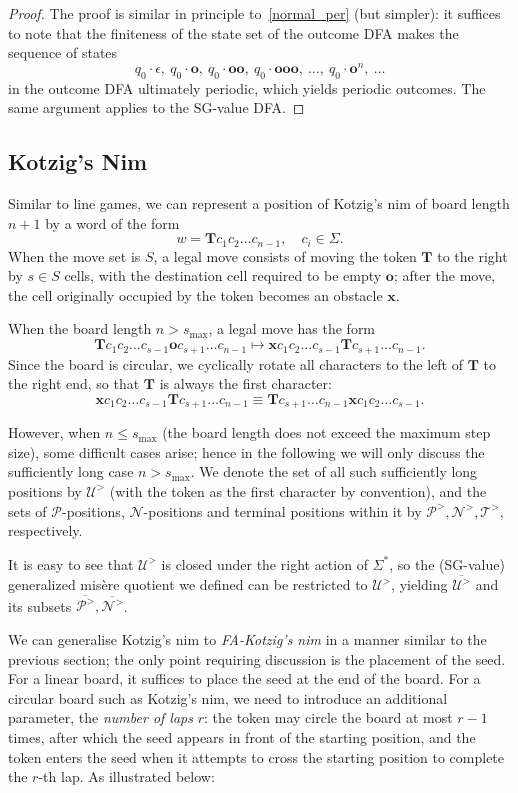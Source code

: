 \documentclass[11pt]{article}
\theoremstyle{definition}
\theoremstyle{plain}
\newcommand{\varP}{\mathcal{P}}
\newcommand{\varN}{\mathcal{N}}
\newcommand{\x}{\mathbf{x}}
\newcommand{\e}{\mathbf{o}}
\newcommand{\m}{\mathbf{T}}
\newcommand{\varU}{\mathcal{U}}
\newcommand{\varT}{\mathcal{T}}
\begin{document}
\begin{proof}
    The proof is similar in principle to~\ref{normal_per} (but simpler): it suffices to note that the finiteness of the state set of the outcome DFA makes the sequence of states
    \[
        q_0\cdot\epsilon,\ q_0\cdot\e,\ q_0\cdot\e\e,\ q_0\cdot\e\e\e,\ \ldots,\ q_0\cdot\e^n,\ \ldots
    \]
    in the outcome DFA ultimately periodic, which yields periodic outcomes. The same argument applies to the SG-value DFA.
\end{proof}

\subsection{Kotzig's Nim}

Similar to line games, we can represent a position of Kotzig's nim of board length $n+1$ by a word of the form
\[
    w = \m c_1 c_2 \ldots c_{n-1},\quad c_i \in \varSigma.
\]
When the move set is $S$, a legal move consists of moving the token $\m$ to the right by $s\in S$ cells, with the destination cell required to be empty $\e$; after the move, the cell originally occupied by the token becomes an obstacle $\x$.

When the board length $n > s_{\max}$, a legal move has the form
\[
     \m c_1 c_2 \ldots c_{s-1} \e c_{s+1} \ldots  c_{n-1}  \mapsto \x c_1 c_2 \ldots c_{s-1}\m c_{s+1} \ldots c_{n-1}.
\]
Since the board is circular, we cyclically rotate all characters to the left of $\m$ to the right end, so that $\m$ is always the first character:
\[
    \x c_1 c_2 \ldots c_{s-1}\m c_{s+1} \ldots c_{n-1} \equiv \m c_{s+1} \ldots c_{n-1}\x c_1 c_2 \ldots c_{s-1}.
\]

However, when $n\leq s_{\max}$ (the board length does not exceed the maximum step size), some difficult cases arise; hence in the following we will only discuss the sufficiently long case $n> s_{\max}$.
We denote the set of all such sufficiently long positions by $\varU^>$ (with the token as the first character by convention), and the sets of $\varP$-positions, $\varN$-positions and terminal positions within it by $\varP^>, \varN^>, \varT^>$, respectively.

It is easy to see that $\varU^>$ is closed under the right action of $\varSigma^*$, so the (SG-value) generalized misère quotient we defined can be restricted to $\varU^>$, yielding $\overline{\varU^>}$ and its subsets $\overline{\varP^>}, \overline{\varN^>}$.

We can generalise Kotzig's nim to \textit{FA-Kotzig's nim} in a manner similar to the previous section; the only point requiring discussion is the placement of the seed.
For a linear board, it suffices to place the seed at the end of the board.
For a circular board such as Kotzig's nim, we need to introduce an additional parameter, the \textit{number of laps} $r$:
the token may circle the board at most $r-1$ times, after which the seed appears in front of the starting position, and the token enters the seed when it attempts to cross the starting position to complete the $r$-th lap.
As illustrated below:
\end{document}
